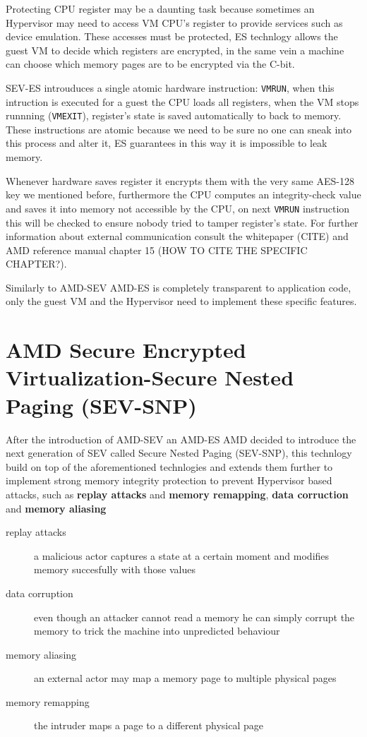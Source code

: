 \documentclass[twocolumn]{article}
\begin{document}
    Protecting CPU register may be a daunting task because sometimes an Hypervisor may need to access VM CPU's register to provide services such as device emulation. These accesses must be protected, ES technlogy allows the guest VM to decide which registers are encrypted, in the same vein a machine can choose which memory pages are to be encrypted via the C-bit.

    SEV-ES introuduces a single atomic hardware instruction: \texttt{VMRUN}, when this intruction is executed for a guest the CPU loads all registers, when the VM stops runnning (\texttt{VMEXIT}), register's state is saved automatically to  back to memory. These instructions are atomic because we need to be sure no one can sneak into this process and alter it, ES guarantees in this way it is impossible to leak memory.

    Whenever hardware saves register it encrypts them with the very same AES-128 key we mentioned before, furthermore the CPU computes an integrity-check value and saves it into memory not accessible by the CPU, on next \texttt{VMRUN} instruction this will be checked to ensure nobody tried to tamper register's state. For further information about external communication consult the whitepaper (CITE) and AMD reference manual chapter 15 (HOW TO CITE THE SPECIFIC CHAPTER?).

    Similarly to AMD-SEV AMD-ES is completely transparent to application code, only the guest VM and the Hypervisor need to implement these specific features.

\section{AMD Secure Encrypted Virtualization-Secure Nested Paging (SEV-SNP)}

    After the introduction of AMD-SEV an AMD-ES AMD decided to introduce the next generation of SEV called Secure Nested Paging (SEV-SNP), this technlogy build on top of the aforementioned technlogies and extends them further to implement strong memory integrity protection to prevent Hypervisor based attacks, such as \textbf{replay attacks} and \textbf{memory remapping}, \textbf{data corruction} and \textbf{memory aliasing}

    \begin{description}
        \item[replay attacks] a malicious actor captures a state at a certain moment and modifies memory succesfully with those values
        \item[data corruption]  even though an attacker cannot read a memory he can simply corrupt the memory to trick the machine into unpredicted behaviour
        \item[memory aliasing]  an external actor may map a memory page to multiple physical pages
        \item[memory remapping]  the intruder maps a page to a different physical page
    \end{description}
\end{document}
